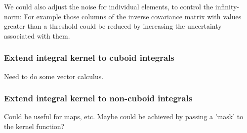 \documentclass[a4paper]{article}
\begin{document}
\begin{multicols}{2}
We could also adjust the noise for individual elements, to control the infinity-norm: For example those columns of the inverse covariance matrix with values greater than a threshold could be reduced by increasing the uncertainty associated with them.

\subsubsection{Extend integral kernel to cuboid integrals}

Need to do some vector calculus.

\subsubsection{Extend integral kernel to non-cuboid integrals}

Could be useful for maps, etc. Maybe could be achieved by passing a 'mask' to the kernel function?




\end{multicols}
\end{document}
